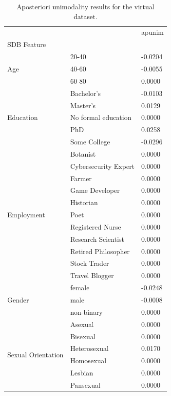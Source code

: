 \begin{table}[t]
\caption{Aposteriori unimodality results for the virtual dataset.}
\label{tab:synthetic_vmd}
\centering\begin{tabular*}{\textwidth}{@{\extracolsep{\fill}}lll}
\toprule
 &  & apunim \\
SDB Feature &  &  \\
\midrule
\multirow[t]{3}{*}{Age} & 20-40 & -0.0204 \\
 & 40-60 & -0.0055 \\
 & 60-80 & 0.0000 \\
\cline{1-3}
\multirow[t]{5}{*}{Education} & Bachelor's & -0.0103 \\
 & Master's & 0.0129 \\
 & No formal education & 0.0000 \\
 & PhD & 0.0258 \\
 & Some College & -0.0296 \\
\cline{1-3}
\multirow[t]{11}{*}{Employment} & Botanist & 0.0000 \\
 & Cybersecurity Expert & 0.0000 \\
 & Farmer & 0.0000 \\
 & Game Developer & 0.0000 \\
 & Historian & 0.0000 \\
 & Poet & 0.0000 \\
 & Registered Nurse & 0.0000 \\
 & Research Scientist & 0.0000 \\
 & Retired Philosopher & 0.0000 \\
 & Stock Trader & 0.0000 \\
 & Travel Blogger & 0.0000 \\
\cline{1-3}
\multirow[t]{3}{*}{Gender} & female & -0.0248 \\
 & male & -0.0008 \\
 & non-binary & 0.0000 \\
\cline{1-3}
\multirow[t]{6}{*}{Sexual Orientation} & Asexual & 0.0000 \\
 & Bisexual & 0.0000 \\
 & Heterosexual & 0.0170 \\
 & Homosexual & 0.0000 \\
 & Lesbian & 0.0000 \\
 & Pansexual & 0.0000 \\
\cline{1-3}
\bottomrule
\end{tabular*}
\end{table}
